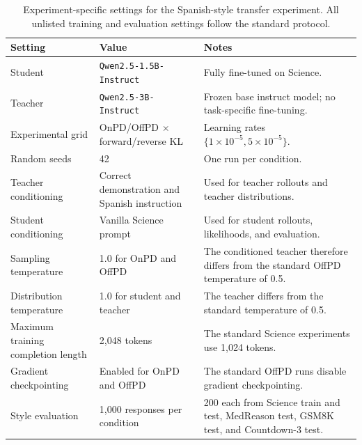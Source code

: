 \documentclass{article} %
\theoremstyle{plain}
\theoremstyle{definition}
\theoremstyle{remark}
\begin{document}
\begin{table}[t]
\centering
\small
\setlength{\tabcolsep}{5pt}
\renewcommand{\arraystretch}{1.12}
\begin{tabularx}{\textwidth}{p{}p{}X}
\toprule
Setting & Value & Notes \\
\midrule

Student
& \texttt{Qwen2.5-1.5B-Instruct}
& Fully fine-tuned on Science. \\

Teacher
& \texttt{Qwen2.5-3B-Instruct}
& Frozen base instruct model; no task-specific fine-tuning. \\

Experimental grid
& OnPD/OffPD $\times$ forward/reverse KL
& Learning rates $\{1\times10^{-5},5\times10^{-5}\}$. \\

Random seeds
& 42
& One run per condition. \\

Teacher conditioning
& Correct demonstration and Spanish instruction
& Used for teacher rollouts and teacher distributions. \\

Student conditioning
& Vanilla Science prompt
& Used for student rollouts, likelihoods, and evaluation. \\

Sampling temperature
& 1.0 for OnPD and OffPD
& The conditioned teacher therefore differs from the standard OffPD temperature of 0.5. \\

Distribution temperature
& 1.0 for student and teacher
& The teacher differs from the standard temperature of 0.5. \\

Maximum training completion length
& 2,048 tokens
& The standard Science experiments use 1,024 tokens. \\

Gradient checkpointing
& Enabled for OnPD and OffPD
& The standard OffPD runs disable gradient checkpointing. \\

Style evaluation
& 1,000 responses per condition
& 200 each from Science train and test, MedReason test, GSM8K test, and Countdown-3 test. \\

\bottomrule
\end{tabularx}
\caption{Experiment-specific settings for the Spanish-style transfer experiment. All unlisted training and evaluation settings follow the standard protocol.}
\label{tab:spanish_style_protocol}
\end{table}
\end{document}
